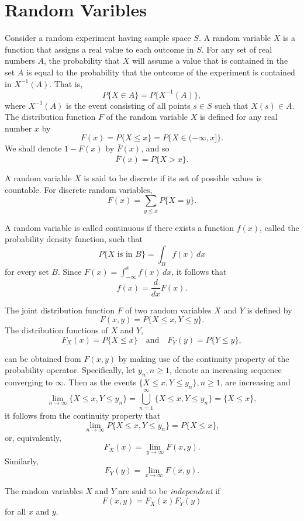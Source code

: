 \documentclass[lang=cn,10pt,thmcnt=section]{elegantbook}
\begin{document}
\section{Random Varibles}
Consider a random experiment having sample space \( S \). A random variable \( X \) is a function that assigns a real value to each outcome in \( S \). For any set of real numbers \( A \), the probability that \( X \) will assume a value that is contained in the set \( A \) is equal to the probability that the outcome of the experiment is contained in \( X^{-1}(A) \). That is,
\[
P\{X \in A\} = P\{X^{-1}(A)\},
\]
where \( X^{-1}(A) \) is the event consisting of all points \( s \in S \) such that \( X(s) \in A \). The distribution function \( F \) of the random variable \( X \) is defined for any real number \( x \) by
\[
F(x) = P\{X \leq x\} = P\{X \in (-\infty, x]\}.
\]
We shall denote \( 1 - F(x) \) by \( \bar{F}(x) \), and so
\[
\bar{F}(x) = P\{X > x\}.
\]

A random variable \( X \) is said to be discrete if its set of possible values is countable. For discrete random variables,
\[
F(x) = \sum_{y \leq x} P\{X = y\}.
\]

A random variable is called continuous if there exists a function \( f(x) \), called the probability density function, such that
\[
P\{X \text{ is in } B\} = \int_B f(x) \, dx
\]
for every set \( B \). Since \( F(x) = \int_{-\infty}^x f(x) \, dx \), it follows that
\[
f(x) = \frac{d}{dx} F(x).
\]

The joint distribution function \( F \) of two random variables \( X \) and \( Y \) is defined by
\[
F(x, y) = P\{X \leq x, Y \leq y\}.
\]
The distribution functions of \( X \) and \( Y \),
\[
F_X(x) = P\{X \leq x\} \quad \text{and} \quad F_Y(y) = P\{Y \leq y\},
\]

can be obtained from \( F(x, y) \) by making use of the continuity property of the probability operator. Specifically, let \( y_n, n \geq 1 \), denote an increasing sequence converging to \( \infty \). Then as the events \( \{X \leq x, Y \leq y_n\}, n \geq 1 \), are increasing and
\[
\lim_{n \to \infty} \{X \leq x, Y \leq y_n\} = \bigcup_{n=1}^{\infty} \{X \leq x, Y \leq y_n\} = \{X \leq x\},
\]
it follows from the continuity property that
\[
\lim_{n \to \infty} P\{X \leq x, Y \leq y_n\} = P\{X \leq x\},
\]
or, equivalently,
\[
F_X(x) = \lim_{y \to \infty} F(x, y).
\]
Similarly,
\[
F_Y(y) = \lim_{x \to \infty} F(x, y).
\]

The random variables \(X\) and \(Y\) are said to be \textit{independent} if
\[
F(x, y) = F_X(x) F_Y(y)
\]
for all \(x\) and \(y\).
\end{document}

